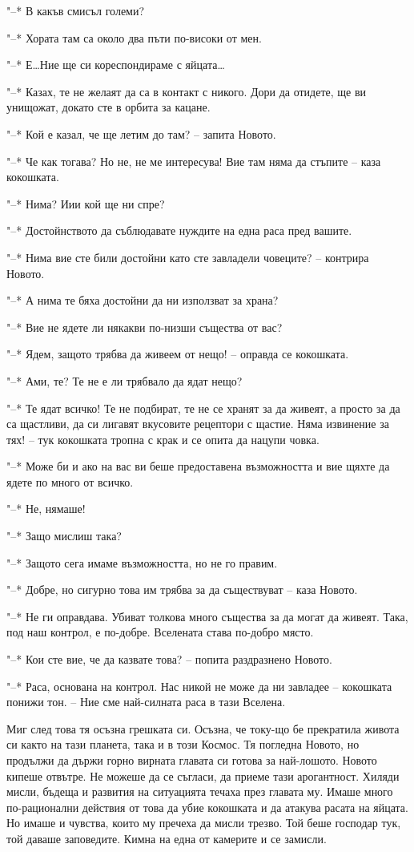 \documentclass[ebook,openany,12pt]{memoir}
\begin{document}
"--* В какъв смисъл големи?

"--* Хората там са около два пъти по-високи от мен.

"--* Е\ldots Ние ще си кореспондираме с яйцата\ldots

"--* Казах, те не желаят да са в контакт с никого. Дори да отидете, ще ви унищожат, докато сте в орбита за кацане.

"--* Кой е казал, че ще летим до там? – запита Новото.

"--* Че как тогава? Но не, не ме интересува! Вие там няма да стъпите – каза кокошката.

"--* Нима? Иии кой ще ни спре?

"--* Достойнството да съблюдавате нуждите на една раса пред вашите.

"--* Нима вие сте били достойни като сте завладели човеците? – контрира Новото.

"--* А нима те бяха достойни да ни използват за храна?

"--* Вие не ядете ли някакви по-низши същества от вас?

"--* Ядем, защото трябва да живеем от нещо! – оправда се кокошката.

"--* Ами, те? Те не е ли трябвало да ядат нещо?

"--* Те ядат всичко! Те не подбират, те не се хранят за да живеят, а просто за да са щастливи, да си лигавят вкусовите рецептори с щастие. Няма извинение за тях! – тук кокошката тропна с крак и се опита да нацупи човка.

"--* Може би и ако на вас ви беше предоставена възможността и вие щяхте да ядете по много от всичко.

"--* Не, нямаше!

"--* Защо мислиш така?

"--* Защото сега имаме възможността, но не го правим.

"--* Добре, но сигурно това им трябва за да съществуват – каза Новото.

"--* Не ги оправдава. Убиват толкова много същества за да могат да живеят. Така, под наш контрол, е по-добре. Вселената става по-добро място.

"--* Кои сте вие, че да казвате това? – попита раздразнено Новото.

"--* Раса, основана на контрол. Нас никой не може да ни завладее – кокошката понижи тон. – Ние сме най-силната раса в тази Вселена.

Миг след това тя осъзна грешката си. Осъзна, че току-що бе прекратила живота си както на тази планета, така и в този Космос. Тя погледна Новото, но продължи да държи горно вирната главата си готова за най-лошото. Новото кипеше отвътре. Не можеше да се съгласи, да приеме тази арогантност. Хиляди мисли, бъдеща и развития на ситуацията течаха през главата му. Имаше много по-рационални действия от това да убие кокошката и да атакува расата на яйцата. Но имаше и чувства, които му пречеха да мисли трезво. Той беше господар тук, той даваше заповедите. Кимна на една от камерите и се замисли. 
\end{document}
